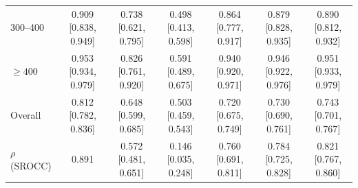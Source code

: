 \begin{table}[htbp]
\begin{tabular}{lcccccc}
    300--400 & 0.909 [0.838, 0.949] & 0.738 [0.621, 0.795] & 0.498 [0.413, 0.598] & 0.864 [0.777, 0.917] & 0.879 [0.828, 0.935] & 0.890 [0.812, 0.932] \\
    $\geq 400$ & 0.953 [0.934, 0.979] & 0.826 [0.761, 0.920] & 0.591 [0.489, 0.675] & 0.940 [0.920, 0.971] & 0.946 [0.922, 0.976] & 0.951 [0.933, 0.979] \\
    \midrule
    Overall & 0.812 [0.782, 0.836] & 0.648 [0.599, 0.685] & 0.503 [0.459, 0.543] & 0.720 [0.675, 0.749] & 0.730 [0.690, 0.761] & 0.743 [0.701, 0.767] \\
    \midrule
    $\rho$ (SROCC) & 0.891 & 0.572 [0.481, 0.651] & 0.146 [0.035, 0.248] & 0.760 [0.691, 0.811] & 0.784 [0.725, 0.828] & 0.821 [0.767, 0.860] \\
    \bottomrule
  \end{tabular}
\end{table}
